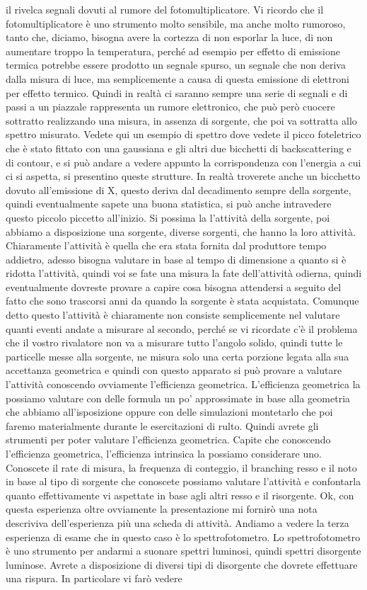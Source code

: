 il rivelca segnali dovuti al rumore del fotomultiplicatore. Vi ricordo che il fotomultiplicatore è uno strumento molto sensibile, ma anche molto rumoroso, tanto che, diciamo, bisogna avere la cortezza di non esporlar la luce, di non aumentare troppo la temperatura, perché ad esempio per effetto di emissione termica potrebbe essere prodotto un segnale spurso, un segnale che non deriva dalla misura di luce, ma semplicemente a causa di questa emissione di elettroni per effetto termico. Quindi in realtà ci saranno sempre una serie di segnali e di passi a un piazzale rappresenta un rumore elettronico, che può però cuocere sottratto realizzando una misura, in assenza di sorgente, che poi va sottratta allo spettro misurato. Vedete qui un esempio di spettro dove vedete il picco foteletrico che è stato fittato con una gaussiana e gli altri due bicchetti di backscattering e di contour, e si può andare a vedere appunto la corrispondenza con l'energia a cui ci si aspetta, si presentino queste strutture. In realtà troverete anche un bicchetto dovuto all'emissione di X, questo deriva dal decadimento sempre della sorgente, quindi eventualmente sapete una buona statistica, si può anche intravedere questo piccolo piccetto all'inizio. Si possima la l'attività della sorgente, poi abbiamo a disposizione una sorgente, diverse sorgenti, che hanno la loro attività. Chiaramente l'attività è quella che era stata fornita dal produttore tempo addietro, adesso bisogna valutare in base al tempo di dimensione a quanto si è ridotta l'attività, quindi voi se fate una misura la fate dell'attività odierna, quindi eventualmente dovreste provare a capire cosa bisogna attendersi a seguito del fatto che sono trascorsi anni da quando la sorgente è stata acquistata. Comunque detto questo l'attività è chiaramente non consiste semplicemente nel valutare quanti eventi andate a misurare al secondo, perché se vi ricordate c'è il problema che il vostro rivalatore non va a misurare tutto l'angolo solido, quindi tutte le particelle messe alla sorgente, ne misura solo una certa porzione legata alla sua accettanza geometrica e quindi con questo apparato si può provare a valutare l'attività conoscendo ovviamente l'efficienza geometrica. L'efficienza geometrica la possiamo valutare con delle formula un po' approssimate in base alla geometria che abbiamo all'isposizione oppure con delle simulazioni montetarlo che poi faremo materialmente durante le esercitazioni di rulto. Quindi avrete gli strumenti per poter valutare l'efficienza geometrica. Capite che conoscendo l'efficienza geometrica, l'efficienza intrinsica la possiamo considerare uno. Conoscete il rate di misura, la frequenza di conteggio, il branching resso e il noto in base al tipo di sorgente che conoscete possiamo valutare l'attività e confontarla quanto effettivamente vi aspettate in base agli altri resso e il risorgente. Ok, con questa esperienza oltre ovviamente la presentazione mi fornirò una nota descriviva dell'esperienza più una scheda di attività. Andiamo a vedere la terza esperienza di esame che in questo caso è lo spettrofotometro. Lo spettrofotometro è uno strumento per andarmi a suonare spettri luminosi, quindi spettri disorgente luminose. Avrete a disposizione di diversi tipi di disorgente che dovrete effettuare una rispura. In particolare vi farò vedere 